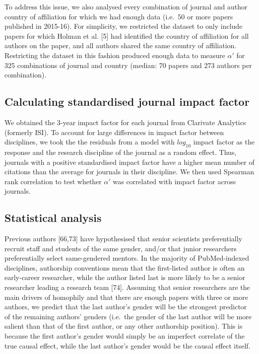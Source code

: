 \documentclass[12pt,]{article}
\begin{document}
To address this issue, we also analysed every combination of journal and
author country of affiliation for which we had enough data (i.e.~50 or
more papers published in 2015-16). For simplicity, we restricted the
dataset to only include papers for which Holman et al. {[}5{]} had
identified the country of affiliation for all authors on the paper, and
all authors shared the same country of affiliation. Restricting the
dataset in this fashion produced enough data to measure \(\alpha'\) for
325 combinations of journal and country (median: 70 papers and 273
authors per combination).

\hypertarget{calculating-standardised-journal-impact-factor}{%
\subsection{Calculating standardised journal impact
factor}\label{calculating-standardised-journal-impact-factor}}

We obtained the 3-year impact factor for each journal from Clarivate
Analytics (formerly ISI). To account for large differences in impact
factor between disciplines, we took the the residuals from a model with
\(log_{10}\) impact factor as the response and the research discipline
of the journal as a random effect. Thus, journals with a positive
standardised impact factor have a higher mean number of citations than
the average for journals in their discipline. We then used Spearman rank
correlation to test whether \(\alpha'\) was correlated with impact
factor across journals.

\hypertarget{statistical-analysis}{%
\subsection{Statistical analysis}\label{statistical-analysis}}

Previous authors {[}66,73{]} have hypothesised that senior scientists
preferentially recruit staff and students of the same gender, and/or
that junior researchers preferentially select same-gendered mentors. In
the majority of PubMed-indexed disciplines, authorship conventions mean
that the first-listed author is often an early-career researcher, while
the author listed last is more likely to be a senior researcher leading
a research team {[}74{]}. Assuming that senior researchers are the main
drivers of homophily and that there are enough papers with three or more
authors, we predict that the last author's gender will be the strongest
predictor of the remaining authors' genders (i.e.~the gender of the last
author will be more salient than that of the first author, or any other
authorship position). This is because the first author's gender would
simply be an imperfect correlate of the true causal effect, while the
last author's gender would be the causal effect itself.
\end{document}
